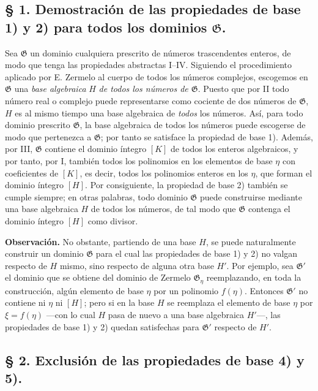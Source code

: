 \subsection*{§ 1. Demostración de las propiedades de base 1) y 2) para todos los dominios $\mathfrak G$.}

Sea $\mathfrak G$ un dominio cualquiera prescrito de números trascendentes enteros, de modo que tenga las propiedades abstractas I--IV. Siguiendo el procedimiento aplicado por E. Zermelo al cuerpo de todos los números complejos, escogemos en $\mathfrak G$ una \emph{base algebraica} $H$ \emph{de todos los números de $\mathfrak G$}. Puesto que por II todo número real o complejo puede representarse como cociente de dos números de $\mathfrak G$, $H$ es al mismo tiempo una base algebraica de \emph{todos} los números. Así, para todo dominio prescrito $\mathfrak G$, la base algebraica de todos los números puede escogerse de modo que pertenezca a $\mathfrak G$; por tanto se satisface la propiedad de base 1). Además, por III, $\mathfrak G$ contiene el dominio íntegro $[K]$ de todos los enteros algebraicos, y por tanto, por I, también todos los polinomios en los elementos de base $\eta$ con coeficientes de $[K]$, es decir, todos los polinomios enteros en los $\eta$, que forman el dominio íntegro $[H]$. Por consiguiente, la propiedad de base 2) también se cumple siempre; en otras palabras, todo dominio $\mathfrak G$ puede construirse mediante una base algebraica $H$ de todos los números, de tal modo que $\mathfrak G$ contenga el dominio íntegro $[H]$ como divisor.

\textbf{Observación.} No obstante, partiendo de una base $H$, se puede naturalmente construir un dominio $\mathfrak G$ para el cual las propiedades de base 1) y 2) no valgan respecto de $H$ mismo, sino respecto de alguna otra base $H'$. Por ejemplo, sea $\mathfrak G'$ el dominio que se obtiene del dominio de Zermelo $\mathfrak G_\eta$ reemplazando, en toda la construcción, algún elemento de base $\eta$ por un polinomio $f(\eta)$. Entonces $\mathfrak G'$ no contiene ni $\eta$ ni $[H]$; pero si en la base $H$ se reemplaza el elemento de base $\eta$ por $\xi=f(\eta)$ ---con lo cual $H$ pasa de nuevo a una base algebraica $H'$---, las propiedades de base 1) y 2) quedan satisfechas para $\mathfrak G'$ respecto de $H'$.

\subsection*{§ 2. Exclusión de las propiedades de base 4) y 5).}

